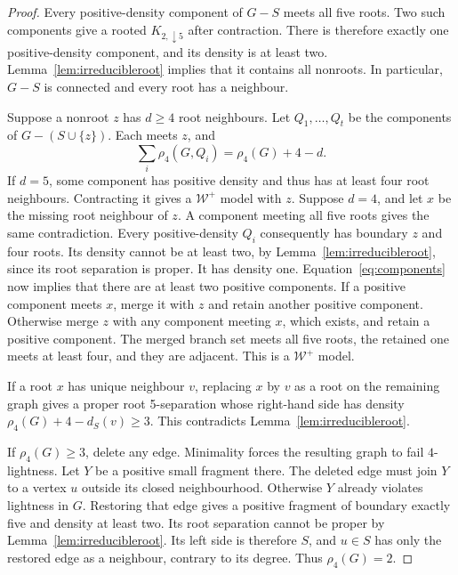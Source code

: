 \documentclass[11pt]{article}
\theoremstyle{remark}
\numberwithin{equation}{section}
\newcommand{\W}{\mathcal W}
\begin{document}
\begin{proof}
Every positive-density component of $G-S$ meets all five roots. Two such components give a rooted $K_{2,\downarrow5}$ after contraction. There is therefore exactly one positive-density component, and its density is at least two. Lemma~\ref{lem:irreducibleroot} implies that it contains all nonroots. In particular, $G-S$ is connected and every root has a neighbour.

Suppose a nonroot $z$ has $d\ge4$ root neighbours. Let $Q_1,\ldots,Q_t$ be the components of $G-(S\cup\{z\})$. Each meets $z$, and
\begin{equation}\label{eq:components}
\sum_i\rho_4(G,Q_i)=\rho_4(G)+4-d.
\end{equation}
If $d=5$, some component has positive density and thus has at least four root neighbours. Contracting it gives a $\W^+$ model with $z$. Suppose $d=4$, and let $x$ be the missing root neighbour of $z$. A component meeting all five roots gives the same contradiction. Every positive-density $Q_i$ consequently has boundary $z$ and four roots. Its density cannot be at least two, by Lemma~\ref{lem:irreducibleroot}, since its root separation is proper. It has density one. Equation~\eqref{eq:components} now implies that there are at least two positive components. If a positive component meets $x$, merge it with $z$ and retain another positive component. Otherwise merge $z$ with any component meeting $x$, which exists, and retain a positive component. The merged branch set meets all five roots, the retained one meets at least four, and they are adjacent. This is a $\W^+$ model.

If a root $x$ has unique neighbour $v$, replacing $x$ by $v$ as a root on the remaining graph gives a proper root 5-separation whose right-hand side has density $\rho_4(G)+4-d_S(v)\ge3$. This contradicts Lemma~\ref{lem:irreducibleroot}.

If $\rho_4(G)\ge3$, delete any edge. Minimality forces the resulting graph to fail $4$-lightness. Let $Y$ be a positive small fragment there. The deleted edge must join $Y$ to a vertex $u$ outside its closed neighbourhood. Otherwise $Y$ already violates lightness in $G$. Restoring that edge gives a positive fragment of boundary exactly five and density at least two. Its root separation cannot be proper by Lemma~\ref{lem:irreducibleroot}. Its left side is therefore $S$, and $u\in S$ has only the restored edge as a neighbour, contrary to its degree. Thus $\rho_4(G)=2$.


\end{proof}
\end{document}
